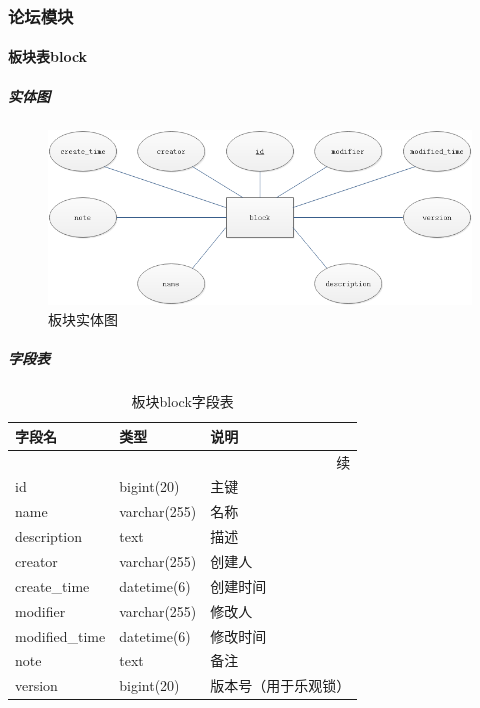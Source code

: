 \documentclass[titlepage,UTF8,linespread=1.5]{ctexart}
\begin{document}
\subsubsection{论坛模块}
\paragraph{板块表block}
\subparagraph{实体图}
\begin{figure}[H]
    \centering
    \includegraphics[width=140mm]{entity-block.png}
    \caption{板块实体图}
    \label{fig:entity-block}
\end{figure}
\subparagraph{字段表}
\begin{longtable}{|p{10em}|p{6em}|p{15em}|}
    \caption{板块block字段表}\label{tab:table_block}     \\\hline
    字段名         & 类型         & 说明                 \\\hline
    \endfirsthead
    \multicolumn{3}{r}{{续\tablename\thetable{}}}        \\\hline
    \endhead
    id             & bigint(20)   & 主键                 \\\hline
    name           & varchar(255) & 名称                 \\\hline
    description    & text         & 描述                 \\\hline
    creator        & varchar(255) & 创建人               \\\hline
    create\_time   & datetime(6)  & 创建时间             \\\hline
    modifier       & varchar(255) & 修改人               \\\hline
    modified\_time & datetime(6)  & 修改时间             \\\hline
    note           & text         & 备注                 \\\hline
    version        & bigint(20)   & 版本号（用于乐观锁） \\\hline
\end{longtable}\par
\end{document}
